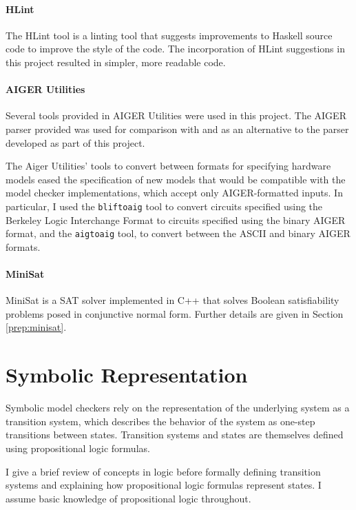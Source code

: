 \documentclass[12pt,a4paper,twoside,openright]{report}
\begin{document}
\paragraph{HLint}{
The HLint tool \cite{hlint} is a linting tool that suggests improvements to Haskell source
code to improve the style of the code.
The incorporation of HLint suggestions in
this project resulted in simpler, more readable code.
}

\paragraph{AIGER Utilities}{
Several tools provided in AIGER Utilities \cite{aiger} were used in this project.
The
AIGER parser provided was used for comparison with and as an alternative
to the parser developed as part of this project. 

The Aiger Utilities' tools to convert between formats for specifying
hardware models eased the specification of new models that would
be compatible with the model checker implementations,
which accept only AIGER-formatted inputs.
In particular, I used the {\tt bliftoaig}
tool to convert circuits specified using the Berkeley Logic Interchange Format
to circuits specified using the binary AIGER format, and the {\tt aigtoaig} tool,
to convert between the ASCII and binary AIGER formats. }

\paragraph{MiniSat}{
MiniSat \cite{minisat,een05}
is a SAT solver implemented in C++ that solves Boolean satisfiability problems
posed in conjunctive normal form. Further details are given in Section \ref{prep:minisat}.
}

\section{Symbolic Representation}
\label{prep:logic}

Symbolic model checkers rely on the representation of the underlying system as a
transition system, which describes the behavior of the system as one-step transitions
between states. Transition systems and states are themselves defined using
propositional logic formulas.

I give a brief review of concepts in logic before formally defining transition systems
and explaining how propositional logic formulas represent states. I assume basic
knowledge of propositional logic throughout.
\end{document}
